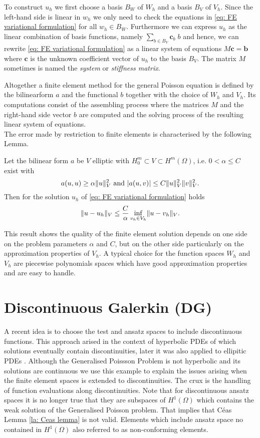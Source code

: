 To construct $u_h$ we first choose a basis $B_W$ of $W_h$ and a basis $B_V$ of $V_h$.
Since the left-hand side is linear in $w_h$ we only need to check the equations in \eqref{eq: FE variational formulation} for all $w_h \in B_W$. 
Furthermore we can express $u_h$ as the linear combination of basis functions, namely $\sum_{b \in B_V} \mathbf{c}_b \; b$ and hence, we can rewrite \eqref{eq: FE variational formulation} as a linear system of equations $M \mathbf{c} = \mathbf{b}$ where  $\mathbf{c}$ is the unknown coefficient vector of $u_h$ to the basis $B_V$.  The matrix $M$ sometimes is named the \emph{system} or \emph{stiffness matrix}.

Altogether a finite element method for the general Poisson equation is defined by the bilinearform $a$ and the functional $b$ together with the choice of $W_h$ and $V_h$. Its computations consist of the assembling process where the matrices $M$ and the right-hand side vector $b$ are computed and the solving process of the resulting linear system of equations.\\
The error made by restriction to finite elements is characterised by the following Lemma.
\begin{lemma} \label{la: Ceas lemma}
	Let the bilinear form $a$ be $V$ elliptic with $H_0^m \subset V \subset H^m(\Omega) $, i.e. $0 < \alpha \leq C$ exist with
	\[
		a(u,u) \geq \alpha  \lVert u \rVert ^2_V \text{ and } |a(u,v)| \leq C \lVert u \rVert ^2_V \lVert v \rVert ^2_V.
	\]
	Then for the solution $u_h$ of \eqref{eq: FE variational formulation}  holds
	\begin{align}
		\lVert u - u_h \rVert_V \leq \frac C \alpha \inf\limits_{v_h \in V_h} \lVert u-v_h \rVert_V.
	\end{align}
\end{lemma}
This result shows the quality of the finite element solution depends on one side on the problem parameters $\alpha$ and $C$, but on the other side particularly on the approximation properties of $V_h$. A typical choice for the function spaces $W_h$ and $V_h$ are piecewise polynomials spaces which have good approximation properties and are easy to handle.

\section{Discontinuous Galerkin (DG)} \label{sec: SIPG}
A recent idea is to choose the test and ansatz spaces to include discontinuous functions. This approach arised in the context of hyperbolic PDEs of which solutions eventually contain discontinuities, later it was also applied to ellipitic PDEs \cite{ABC+2002}. Although the Generalised Poissson Problem is not hyperbolic and its solutions are continuous we use this example to explain the issues arising when the finite element spaces is extended to discontinuities. The crux is the handling of function evaluations along discontinuities. Note that for discontinuous ansatz spaces it is no longer true that they are subspaces of $H^1(\Omega)$ which contains the weak solution of the Generalised Poisson problem. That implies that C\'eas Lemma \ref{la: Ceas lemma} is not valid. Elements which include ansatz space no contained in $H^1(\Omega)$ also referred to as non-conforming elements.

